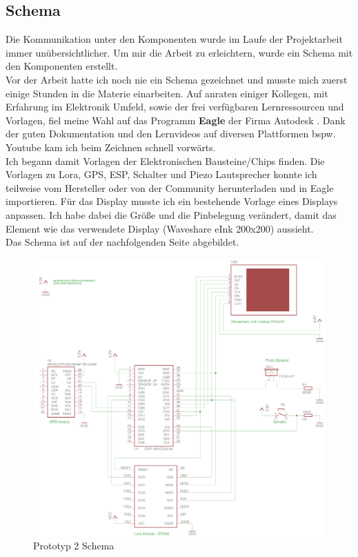 \documentclass[11pt,english,german]{report}
\theoremstyle{definition}
\begin{document}
\subsection{Schema}
Die Kommunikation unter den Komponenten wurde im Laufe der Projektarbeit immer unübersichtlicher. Um mir die Arbeit zu erleichtern, wurde ein Schema mit den Komponenten erstellt.\\[0.3cm]
Vor der Arbeit hatte ich noch nie ein Schema gezeichnet und musste mich zuerst einige Stunden in die Materie einarbeiten. Auf anraten einiger Kollegen, mit Erfahrung im Elektronik Umfeld, sowie der frei verfügbaren Lernressourcen und Vorlagen, fiel meine Wahl auf das Programm \textbf{Eagle} der Firma Autodesk \cite{autodesk}. Dank der guten Dokumentation und den Lernvideos auf diversen Plattformen bspw. Youtube kam ich beim Zeichnen schnell vorwärts. \\[0.3cm] 
Ich begann damit Vorlagen der Elektronischen Bausteine/Chips finden. Die Vorlagen zu Lora, GPS, ESP, Schalter und Piezo Lautsprecher konnte ich teilweise vom Hersteller oder von der Community herunterladen und in Eagle importieren. Für das Display musste ich ein bestehende Vorlage eines Displays anpassen. Ich habe dabei die Größe und die Pinbelegung verändert, damit das Element wie das verwendete Display (Waveshare eInk 200x200) aussieht. \\[0.3cm]
Das Schema ist auf der nachfolgenden Seite abgebildet.
\newpage

\begin{figure}[H]
	\centering
	\includegraphics[width=\textwidth]{img/prototype/prototyp_schema.png}
	\caption[Prototyp2 Schema]
	{Prototyp 2 Schema}
\end{figure}
\end{document}
